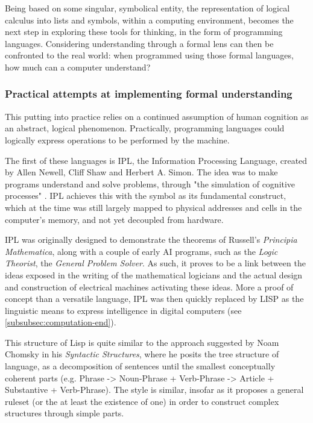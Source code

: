 Being based on some singular, symbolical entity, the representation of logical calculus into lists and symbols, within a computing environment, becomes the next step in exploring these tools for thinking, in the form of programming languages. Considering understanding through a formal lens can then be confronted to the real world: when programmed using those formal languages, how much can a computer understand?

\subsubsection{Practical attempts at implementing formal understanding}
\label{subsubsec:practical-understanding}

This putting into practice relies on a continued assumption of human cognition as an abstract, logical phenomenon. Practically, programming languages could logically express operations to be performed by the machine.

The first of these languages is IPL, the Information Processing Language, created by Allen Newell, Cliff Shaw and Herbert A. Simon.  The idea was to make programs understand and solve problems, through "the simulation of cognitive processes" \citep{newell_information_1964}. IPL achieves this with the symbol as its fundamental construct, which at the time was still largely mapped to physical addresses and cells in the computer's memory, and not yet decoupled from hardware.

IPL was originally designed to demonstrate the theorems of Russell's \emph{Principia Mathematica}, along with a couple of early AI programs, such as the \emph{Logic Theorist}, the \emph{General Problem Solver}. As such, it proves to be a link between the ideas exposed in the writing of the mathematical logicians and the actual design and construction of electrical machines activating these ideas. More a proof of concept than a versatile language, IPL was then quickly replaced by LISP as the linguistic means to express intelligence in digital computers (see \autoref{subsubsec:computation-end}).

This structure of Lisp is quite similar to the approach suggested by Noam Chomsky in his \emph{Syntactic Structures}, where he posits the tree structure of language, as a decomposition of sentences until the smallest conceptually coherent parts (e.g. Phrase -> Noun-Phrase + Verb-Phrase -> Article + Substantive + Verb-Phrase). The style is similar, insofar as it proposes a general ruleset (or the at least the existence of one) in order to construct complex structures through simple parts.

